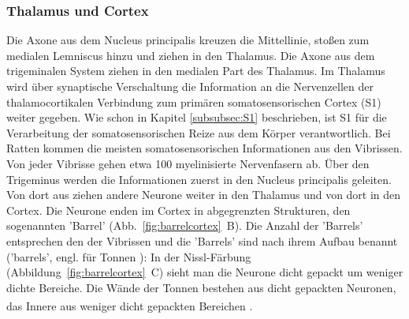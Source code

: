 \subsubsection*{Thalamus und Cortex}
Die Axone aus dem Nucleus principalis kreuzen die Mittellinie, stoßen zum medialen Lemniscus hinzu und ziehen in den Thalamus. Die Axone aus dem trigeminalen System ziehen in den medialen Part des Thalamus. Im Thalamus wird über synaptische Verschaltung die Information an die Nervenzellen der thalamocortikalen Verbindung zum primären somatosensorischen Cortex (S1) weiter gegeben. 
Wie schon in Kapitel \ref{subsubsec:S1} beschrieben, ist S1 für die Verarbeitung der somatosensorischen Reize aus dem Körper verantwortlich. Bei Ratten kommen die meisten somatosensorischen Informationen aus den Vibrissen. Von jeder Vibrisse gehen etwa 100 myelinisierte Nervenfasern ab. Über den Trigeminus werden die Informationen zuerst in den Nucleus principalis geleiten. Von dort aus ziehen andere Neurone weiter in den Thalamus und von dort in den Cortex. Die Neurone enden im Cortex   in abgegrenzten Strukturen, den sogenannten 'Barrel' (Abb.~\ref{fig:barrelcortex}~B). Die Anzahl der 'Barrels' entsprechen den der Vibrissen und die 'Barrels' sind nach ihrem Aufbau benannt ('barrels', engl. für Tonnen ): In der Nissl-Färbung (Abbildung~\ref{fig:barrelcortex}~C) sieht man die Neurone dicht gepackt um weniger dichte Bereiche. Die Wände der Tonnen bestehen aus dicht gepackten Neuronen, das Innere aus weniger dicht gepackten Bereichen \textsuperscript{\cite[Kap.~8]{smith2008biology}}. 

